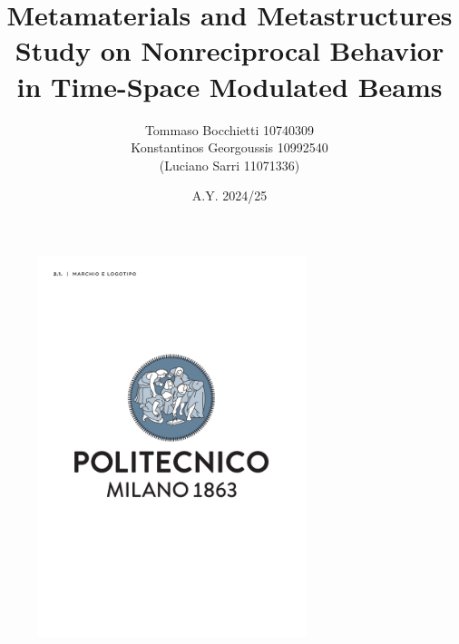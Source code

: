 \documentclass[draft=false]{assignment}
\begin{document}
\title{Metamaterials and Metastructures \\ Study on Nonreciprocal Behavior in Time-Space Modulated Beams}
\author{Tommaso Bocchietti 10740309 \\ Konstantinos Georgoussis 10992540 \\ (Luciano Sarri 11071336)}
\date{A.Y. 2024/25}

\maketitle

\begin{figure}[H]
    \centering
    \includegraphics[width=0.7\textwidth]{./pdf/Polimi_logo_coverpage.pdf}
    \label{fig:Polimi_logo}
\end{figure}

\clearpage
\tableofcontents
\listoffigures
\listoftables

\clearpage








\vspace*{\fill}
\nocite{*}


\end{document}
